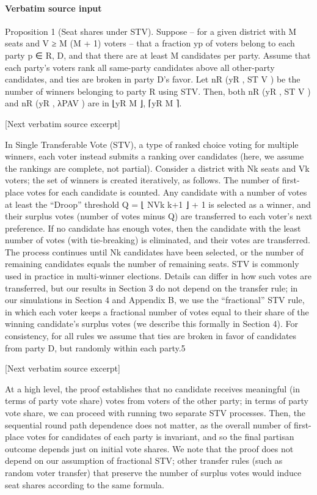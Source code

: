 \documentclass[10pt]{article}
\begin{document}
\paragraph{Verbatim source input}
\begin{ReviewVerbatim}
Proposition 1 (Seat shares under STV). Suppose – for a given district with M seats and V ≥
M (M + 1) voters – that a fraction yp of voters belong to each party p ∈ {R, D}, and that there are
at least M candidates per party. Assume that each party’s voters rank all same-party candidates
above all other-party candidates, and ties are broken in party D’s favor.
    Let nR (yR , ST V ) be the number of winners belonging to party R using STV. Then, both
nR (yR , ST V ) and nR (yR , λPAV ) are in {⌊yR M ⌋, ⌈yR M ⌉}.

[Next verbatim source excerpt]

    In Single Transferable Vote (STV), a type of ranked choice voting for multiple winners, each
voter instead submits a ranking over candidates (here, we assume the rankings are complete, not
partial). Consider a district with Nk seats and Vk voters; the set of winners is created iteratively, as
follows. The number of first-place votes for each candidate is counted. Any candidate with a number
of votes at least the “Droop” threshold Q = ⌊ NVk k+1 ⌋ + 1 is selected as a winner, and their surplus
votes (number of votes minus Q) are transferred to each voter’s next preference. If no candidate has
enough votes, then the candidate with the least number of votes (with tie-breaking) is eliminated,
and their votes are transferred. The process continues until Nk candidates have been selected, or
the number of remaining candidates equals the number of remaining seats. STV is commonly used
in practice in multi-winner elections.
    Details can differ in how such votes are transferred, but our results in Section 3 do not depend
on the transfer rule; in our simulations in Section 4 and Appendix B, we use the “fractional” STV
rule, in which each voter keeps a fractional number of votes equal to their share of the winning
candidate’s surplus votes (we describe this formally in Section 4). For consistency, for all rules we
assume that ties are broken in favor of candidates from party D, but randomly within each party.5

[Next verbatim source excerpt]

    At a high level, the proof establishes that no candidate receives meaningful (in terms of party
vote share) votes from voters of the other party; in terms of party vote share, we can proceed with
running two separate STV processes. Then, the sequential round path dependence does not matter,
as the overall number of first-place votes for candidates of each party is invariant, and so the final
partisan outcome depends just on initial vote shares. We note that the proof does not depend on
our assumption of fractional STV; other transfer rules (such as random voter transfer) that preserve
the number of surplus votes would induce seat shares according to the same formula.


\end{ReviewVerbatim}
\end{document}
